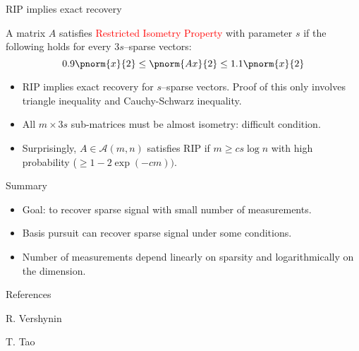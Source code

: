\documentclass{beamer}
\begin{document}
\begin{frame}{RIP implies exact recovery}
	\begin{definition}[RIP]
		A matrix $A$ satisfies \textcolor{red}
		{Restricted Isometry Property} with parameter $s$
		if the following holds for every $3s$--sparse vectors:
		\[
			0.9\pnorm{x}{2}\leq \pnorm{Ax}{2}\leq 1.1\pnorm{x}{2}
		\]
	\end{definition}
	\pause
	
	\begin{itemize}
		\item \mbox{RIP} implies exact recovery for $s$--sparse
			vectors. Proof of this only involves triangle inequality
			and Cauchy-Schwarz inequality.

			\pause

		\item All $m\times 3s$ sub-matrices must be almost isometry:
			difficult condition.

			\pause

		\item Surprisingly, $A\in\mathcal{A}(m, n)$
			satisfies \mbox{RIP}
			if $m\geq cs\log n$ with high probability
			($\geq 1-2\exp(-cm))$.

	\end{itemize}
			
\end{frame}
	
\begin{frame}{Summary}
	\begin{itemize}
		\item Goal: to recover sparse signal with small number of
			measurements.

			\vspace{10mm}
			\pause

		\item Basis pursuit can recover sparse signal under some
			conditions.

			\vspace{10mm}
			\pause

		\item Number of measurements depend linearly on sparsity
			and logarithmically on the dimension.
	\end{itemize}
\end{frame}


\begin{frame}{References}
\begin{thebibliography}{10}
\alert{R. Vershynin}

\alert{T. Tao}
\end{thebibliography}
\end{frame}
\end{document}
